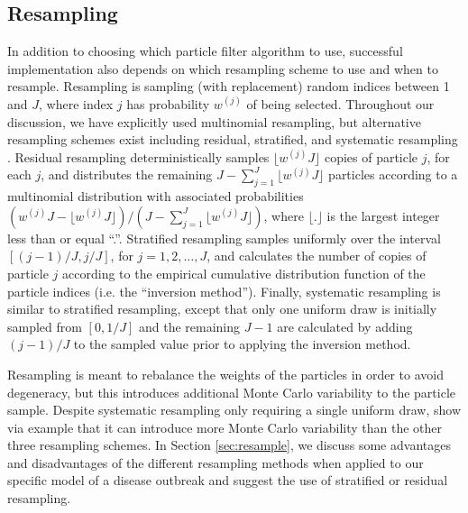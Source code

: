 \documentclass{elsarticle}
\begin{document}
\subsection{Resampling \label{sec:advice}}

In addition to choosing which particle filter algorithm to use, successful implementation also depends on which resampling scheme to use and when to resample. Resampling is sampling (with replacement) random indices between 1 and $J$, where index $j$ has probability $w^{(j)}$ of being selected. Throughout our discussion, we have explicitly used multinomial resampling, but alternative resampling schemes exist including residual, stratified, and systematic resampling \citep{Douc:Capp:Moul:comp:2005}. Residual resampling deterministically samples $\lfloor w^{(j)} J \rfloor$ copies of particle $j$, for each $j$, and distributes the remaining $J - \sum^J_{j=1} \lfloor w^{(j)} J \rfloor$  particles according to a multinomial distribution with associated probabilities $(w^{(j)} J - \lfloor w^{(j)} J \rfloor) / (J - \sum^J_{j=1} \lfloor w^{(j)} J \rfloor)$, where $\lfloor . \rfloor$ is the largest integer less than or equal ``.''. Stratified resampling samples uniformly over the interval $[(j-1) / J, j / J]$, for $j = 1, 2, \ldots, J$, and calculates the number of copies of particle $j$ according to the empirical cumulative distribution function of the particle indices (i.e. the ``inversion method''). Finally, systematic resampling is similar to stratified resampling, except that only one uniform draw is initially sampled from $[0, 1/J]$ and the remaining $J-1$ are calculated by adding $(j-1) / J$ to the sampled value prior to applying the inversion method.

Resampling is meant to rebalance the weights of the particles in order to avoid degeneracy, but this introduces additional Monte Carlo variability to the particle sample. Despite systematic resampling only requiring a single uniform draw, \citet{Douc:Capp:Moul:comp:2005} show via example that it can introduce more Monte Carlo variability than the other three resampling schemes. In Section \ref{sec:resample}, we discuss some advantages and disadvantages of the different resampling methods when applied to our specific model of a disease outbreak and suggest the use of stratified or residual resampling.
\end{document}
